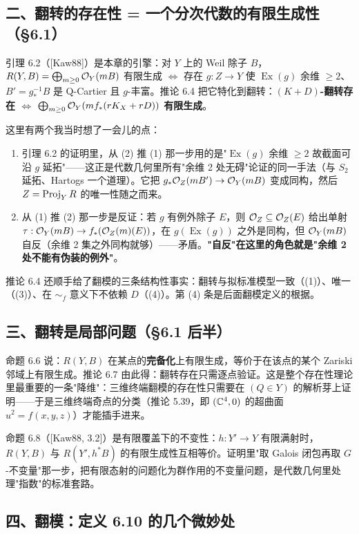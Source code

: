 \subsection*{二、翻转的存在性 = 一个分次代数的有限生成性（\S6.1）}

引理 6.2（[Kaw88]）是本章的引擎：对 $Y$ 上的 Weil 除子 $B$，$R(Y,B)=\bigoplus_{m\ge0}\mathcal{O}_Y(mB)$ 有限生成 $\iff$ 存在 $g:Z\to Y$ 使 $\operatorname{Ex}(g)$ 余维 $\ge2$、$B'=g_*^{-1}B$ 是 Q-Cartier 且 $g$-丰富。推论 6.4 把它特化到翻转：\textbf{$(K+D)$-翻转存在 $\iff$ $\bigoplus_{m\ge0}\mathcal{O}_Y(mf_*(rK_X+rD))$ 有限生成}。

这里有两个我当时想了一会儿的点：

\begin{enumerate}
\item 引理 6.2 的证明里，从 (2) 推 (1) 那一步用的是"$\operatorname{Ex}(g)$ 余维 $\ge2$ 故截面可沿 $g$ 延拓"——这正是代数几何里所有"余维 2 处无碍"论证的同一手法（与 $S_2$ 延拓、Hartogs 一个道理）。它把 $g_*\mathcal{O}_Z(mB')\to\mathcal{O}_Y(mB)$ 变成同构，然后 $Z=\operatorname{Proj}_Y R$ 的唯一性随之而来。
\item 从 (1) 推 (2) 那一步是反证：若 $g$ 有例外除子 $E$，则 $\mathcal{O}_Z\subseteq\mathcal{O}_Z(E)$ 给出单射 $\tau:\mathcal{O}_Y(mB)\to f_*(\mathcal{O}_Z(m)(E))$，在 $g(\operatorname{Ex}(g))$ 之外是同构，但 $\mathcal{O}_Y(mB)$ 自反（余维 2 集之外同构就够）——矛盾。\textbf{"自反"在这里的角色就是"余维 2 处不能有伪装的例外"}。
\end{enumerate}

推论 6.4 还顺手给了翻模的三条结构性事实：翻转与拟标准模型一致（(1)）、唯一（(3)）、在 $\sim_f$ 意义下不依赖 $D$（(4)）。第 (4) 条是后面翻模定义的根据。

\subsection*{三、翻转是局部问题（\S6.1 后半）}

命题 6.6 说：$R(Y,B)$ 在某点的\textbf{完备化}上有限生成，等价于在该点的某个 Zariski 邻域上有限生成。推论 6.7 由此得：翻转存在只需逐点验证。这是整个存在性理论里最重要的一条"降维"：三维终端翻模的存在性只需要在 $(Q\in Y)$ 的解析芽上证明——于是三维终端奇点的分类（推论 5.39，即 $(\mathbb{C}^4,0)$ 的超曲面 $u^2=f(x,y,z)$）才能插手进来。

命题 6.8（[Kaw88, 3.2]）是有限覆盖下的不变性：$h:Y'\to Y$ 有限满射时，$R(Y,B)$ 与 $R(Y',h^*B)$ 的有限生成性互相等价。证明里"取 Galois 闭包再取 $G$-不变量"那一步，把有限态射的问题化为群作用的不变量问题，是代数几何里处理"指数"的标准套路。

\subsection*{四、翻模：定义 6.10 的几个微妙处}

